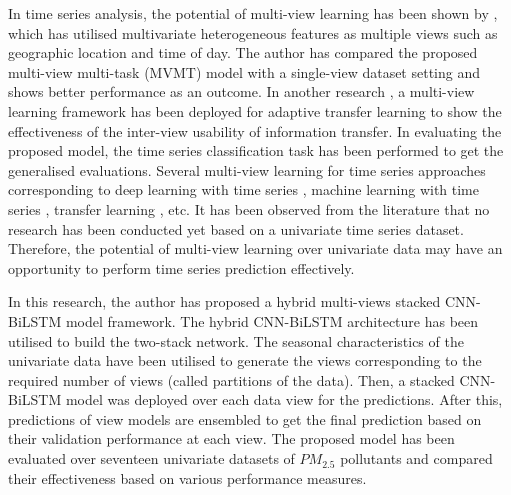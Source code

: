 \par In time series analysis, the potential of multi-view learning has been shown by  \cite{9935292}, which has utilised multivariate heterogeneous features as multiple views such as geographic location and time of day. The author has compared the proposed multi-view multi-task (MVMT) model with a single-view dataset setting and shows better performance as an outcome. In another research \cite{atl2013mts}, a multi-view learning framework has been deployed for adaptive transfer learning to show the effectiveness of the inter-view usability of information transfer. In evaluating the proposed model, the time series classification task has been performed to get the generalised evaluations. Several multi-view learning for time series approaches corresponding to deep learning with time series \cite{mgtl2019tsc,vaw2019dtltsc}, machine learning with time series \cite{vaw2019dtltsc}, transfer learning \cite{mgtl2019tsc, 9935292}, etc. It has been observed from the literature that no research has been conducted yet based on a univariate time series dataset. Therefore, the potential of multi-view learning over univariate data may have an opportunity to perform time series prediction effectively.
\par In this research, the author has proposed a hybrid multi-views stacked CNN-BiLSTM model framework. The hybrid CNN-BiLSTM architecture has been utilised to build the two-stack network. The seasonal characteristics of the univariate data have been utilised to generate the views corresponding to the required number of views (called partitions of the data). Then, a stacked CNN-BiLSTM model was deployed over each data view for the predictions. After this, predictions of view models are ensembled to get the final prediction based on their validation performance at each view. The proposed model has been evaluated over seventeen univariate datasets of $PM_{2.5}$ pollutants and compared their effectiveness based on various performance measures.